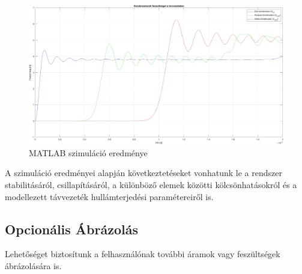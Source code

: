 \documentclass[12pt,a4paper]{article}
\begin{document}
\begin{figure}[H]
    \centering
    \includegraphics[width=1\textwidth]{figures/32matlab.jpg}
    \caption{MATLAB szimuláció eredménye}
    \label{fig:matlab}
\end{figure}

A szimuláció eredményei alapján következtetéseket vonhatunk le a rendszer stabilitásáról, csillapításáról, a különböző elemek közötti kölcsönhatásokról és a modellezett távvezeték hullámterjedési paramétereiről is.

\pagebreak

\subsection*{Opcionális Ábrázolás}

Lehetőséget biztosítunk a felhasználónak további áramok vagy feszültségek ábrázolására is.
\end{document}
